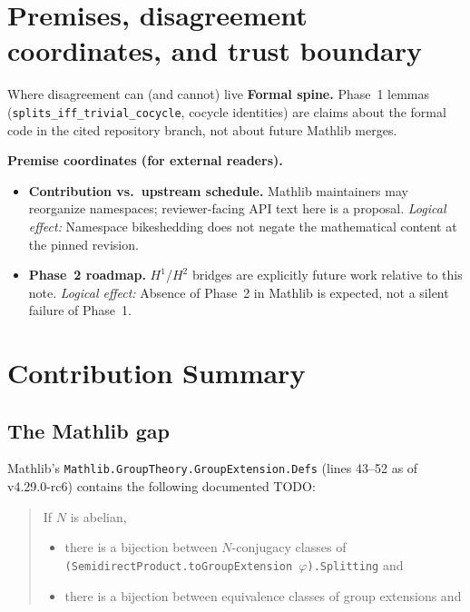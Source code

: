 \documentclass[11pt]{article}
\begin{document}
\section{Premises, disagreement coordinates, and trust boundary}\label{sec:premises-ic-mathlib-companion}
\begin{keybox}{Where disagreement can (and cannot) live}
\textbf{Formal spine.}
Phase~1 lemmas (\texttt{splits\_iff\_trivial\_cocycle}, cocycle identities) are claims about the formal code in the cited repository branch, not about future Mathlib merges.

\medskip
\textbf{Premise coordinates (for external readers).}
{\raggedright
\begin{itemize}[leftmargin=2em]
\item \textbf{Contribution vs.\ upstream schedule.} Mathlib maintainers may reorganize namespaces; reviewer-facing API text here is a proposal.
  \emph{Logical effect:} Namespace bikeshedding does not negate the mathematical content at the pinned revision.
\item \textbf{Phase~2 roadmap.} $H^1$/$H^2$ bridges are explicitly future work relative to this note.
  \emph{Logical effect:} Absence of Phase~2 in Mathlib is expected, not a silent failure of Phase~1.
\end{itemize}
\par}
\end{keybox}

\tableofcontents
\newpage

\section{Contribution Summary}\label{sec:summary}

\subsection{The Mathlib gap}

Mathlib's \texttt{Mathlib.GroupTheory.GroupExtension.Defs} (lines 43--52 as of
v4.29.0-rc6) contains the following documented TODO:

\begin{quote}\itshape\small\raggedright
If $N$ is abelian,
\begin{itemize}[nosep]
\item there is a bijection between $N$-conjugacy classes of\linebreak
  \texttt{(SemidirectProduct.toGroupExtension $\varphi$).Splitting} and\linebreak
\item there is a bijection between equivalence classes of group extensions and\linebreak
\end{itemize}
\end{quote}
\end{document}
